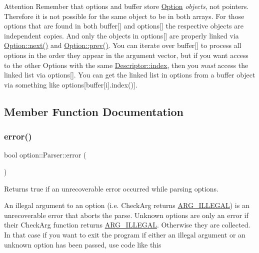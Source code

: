 \begin{DoxyAttention}{Attention}
Remember that {\ttfamily options} and {\ttfamily buffer} store \hyperlink{classoption_1_1Option}{Option} {\itshape objects}, not pointers. Therefore it is not possible for the same object to be in both arrays. For those options that are found in both {\ttfamily buffer}\mbox{[}\mbox{]} and {\ttfamily options}\mbox{[}\mbox{]} the respective objects are independent copies. And only the objects in {\ttfamily options}\mbox{[}\mbox{]} are properly linked via \hyperlink{classoption_1_1Option_a59ae9aed505f4d410633bb36478a32be}{Option\+::next()} and \hyperlink{classoption_1_1Option_a4d12001a91b0b35cf47437d0c60d2b52}{Option\+::prev()}. You can iterate over {\ttfamily buffer}\mbox{[}\mbox{]} to process all options in the order they appear in the argument vector, but if you want access to the other Options with the same \hyperlink{structoption_1_1Descriptor_a1fee8ac44f529c99ac2b1149b4c391b1}{Descriptor\+::index}, then you {\itshape must} access the linked list via {\ttfamily options}\mbox{[}\mbox{]}. You can get the linked list in options from a buffer object via something like {\ttfamily options}\mbox{[}buffer\mbox{[}i\mbox{]}.index()\mbox{]}. 
\end{DoxyAttention}


\subsection{Member Function Documentation}
\mbox{\label{classoption_1_1Parser_a2caa149140067b4d13e4d7a104bb3090}} 
\subsubsection{\texorpdfstring{error()}{error()}}
{\footnotesize\ttfamily bool option\+::\+Parser\+::error (\begin{DoxyParamCaption}{ }\end{DoxyParamCaption})\hspace{0.3cm}{\ttfamily [inline]}}



Returns {\ttfamily true} if an unrecoverable error occurred while parsing options. 

An illegal argument to an option (i.\+e. Check\+Arg returns \hyperlink{namespaceoption_aee8c76a07877335762631491e7a5a1a9a9528e32563b795bd2930b12d0a5e382d}{A\+R\+G\+\_\+\+I\+L\+L\+E\+G\+AL}) is an unrecoverable error that aborts the parse. Unknown options are only an error if their Check\+Arg function returns \hyperlink{namespaceoption_aee8c76a07877335762631491e7a5a1a9a9528e32563b795bd2930b12d0a5e382d}{A\+R\+G\+\_\+\+I\+L\+L\+E\+G\+AL}. Otherwise they are collected. In that case if you want to exit the program if either an illegal argument or an unknown option has been passed, use code like this



